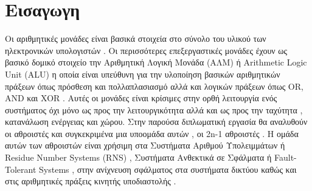 
\section{Εισαγωγη}

Οι αριθμητικές μονάδες είναι βασικά στοιχεία στο σύνολο του υλικού των ηλεκτρονικών υπολογιστών . Οι περισσότερες επεξεργαστικές μονάδες έχουν ως βασικό δομικό στοιχείο την Αριθμητική Λογική Μονάδα (ΑΛΜ) ή Arithmetic Logic Unit (ALU) η οποία είναι υπεύθυνη για την υλοποίηση βασικών αριθμητικών πράξεων όπως πρόσθεση και πολλαπλασιασμό αλλά και λογικών πράξεων όπως OR, AND και XOR . Αυτές οι μονάδες είναι κρίσιμες στην ορθή λειτουργία ενός συστήματος όχι μόνο ως προς την λειτουργικότητα αλλά και ως προς την ταχύτητα , κατανάλωση ενέργειας και χώρου. Στην παρούσα διπλωματική εργασία θα αναλυθούν οι αθροιστές και συγκεκριμένα μια υποομάδα αυτών , οι 2n-1 αθροιστές . Η ομάδα αυτών των αθροιστών είναι χρήσιμη στα Συστήματα Αριθμού Υπολειμμάτων ή Residue Number Systems (RNS) , Συστήματα Ανθεκτικά σε Σφάλματα ή Fault-Tolerant Systems , στην ανίχνευση σφάλματος στα συστήματα δικτύου καθώς και στις αριθμητικές πράξεις κινητής υποδιαστολής \cite{j32_bit} \cite{j64_bit} \cite{modulo}.
